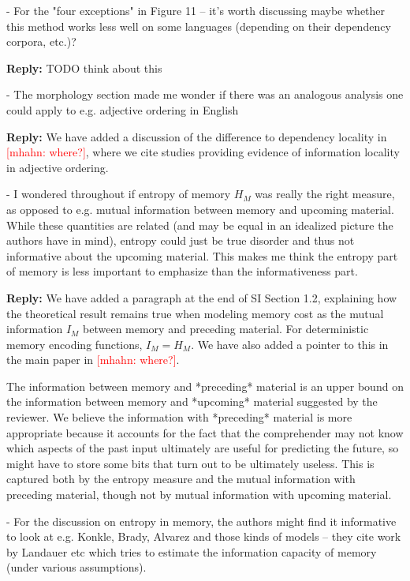 \documentclass{article}[11pt,a4paper,oneside]
\newcommand\mhahn[1]{\textcolor{red}{[mhahn: #1]}}
\newenvironment{reply}
  {\par\medskip
   \color{blue}%
   \begin{framed}
   \textbf{Reply: }\ignorespaces}
 {\end{framed}
  \medskip}
\begin{document}
- For the "four exceptions" in Figure 11 -- it's worth discussing maybe whether this method works less well on some languages (depending on their dependency corpora, etc.)?

\begin{reply}
	TODO think about this
\end{reply}

- The morphology section made me wonder if there was an analogous analysis one could apply to e.g. adjective ordering in English

\begin{reply}
We have added a discussion of the difference to dependency locality in \mhahn{where?}, where we cite studies providing evidence of information locality in adjective ordering.
\end{reply}

- I wondered throughout if entropy of memory $H_M$ was really the right measure, as opposed to e.g. mutual information between memory and upcoming material. While these quantities are related (and may be equal in an idealized picture the authors have in mind), entropy could just be true disorder and thus not informative about the upcoming material. This makes me think the entropy part of memory is less important to emphasize than the informativeness part.

\begin{reply}
We have added a paragraph at the end of SI Section 1.2, explaining how the theoretical result remains true when modeling memory cost as the mutual information $I_M$ between memory and preceding material. For deterministic memory encoding functions, $I_M=H_M$.
	We have also added a pointer to this in the main paper in \mhahn{where?}.

The information between memory and *preceding* material is an upper bound on the information between memory and *upcoming* material suggested by the reviewer.
We believe the information with *preceding* material is more appropriate because it accounts for the fact that the comprehender may not know which aspects of the past input ultimately are useful for predicting the future, so might have to store some bits that turn out to be ultimately useless. This is captured both by the entropy measure and the mutual information with preceding material, though not by mutual information with upcoming material. 
\end{reply}

- For the discussion on entropy in memory, the authors might find it informative to look at e.g. Konkle, Brady, Alvarez and those kinds of models -- they cite work by Landauer etc which tries to estimate the information capacity of memory (under various assumptions).
\end{document}
